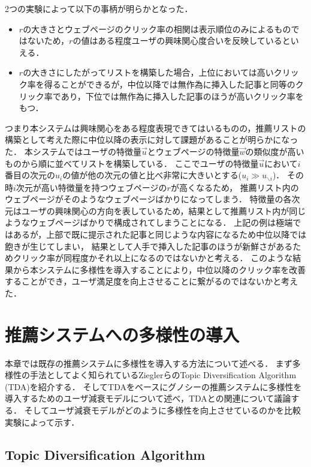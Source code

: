 \documentclass[japanese]{jnlp_1.4}
\begin{document}
2つの実験によって以下の事柄が明らかとなった．

\begin{itemize}
	\item $r$の大きさとウェブページのクリック率の相関は表示順位のみによるものではないため，$r$の値はある程度ユーザの興味関心度合いを反映しているといえる．
	\item $r$の大きさにしたがってリストを構築した場合，上位においては高いクリック率を得ることができるが，中位以降では無作為に挿入した記事と同等のクリック率であり，下位では無作為に挿入した記事のほうが高いクリック率をもつ．
\end{itemize}

つまり本システムは興味関心をある程度表現できてはいるものの，推薦リストの構築として考えた際に中位以降の表示に対して課題があることが明らかになった．
本システムではユーザの特徴量$\vec{u}$とウェブページの特徴量$\vec{w}$の類似度が高いものから順に並べてリストを構築している．
ここでユーザの特徴量$\vec{u}$において$i$番目の次元の$u_i$の値が他の次元の値と比べ非常に大きいとする($u_i \gg u_{\backslash i}$)．
その時$i$次元が高い特徴量を持つウェブページの$r$が高くなるため，
推薦リスト内のウェブページがそのようなウェブページばかりになってしまう．
特徴量の各次元はユーザの興味関心の方向を表しているため，結果として推薦リスト内が同じようなウェブページばかりで構成されてしまうことになる．
上記の例は極端ではあるが，上部で既に提示された記事と同じような内容になるため中位以降では飽きが生じてしまい，
結果として人手で挿入した記事のほうが新鮮さがあるためクリック率が同程度かそれ以上になるのではないかと考える．
このような結果から本システムに多様性を導入することにより，中位以降のクリック率を改善することができ，ユーザ満足度を向上させることに繋がるのではないかと考えた．


\section{推薦システムへの多様性の導入}
\label{sec:purpose}

本章では既存の推薦システムに多様性を導入する方法について述べる．
まず多様性の手法としてよく知られているZieglerらのTopic Diversification Algorithm (TDA)を紹介する\cite{ziegler2005}．
そしてTDAをベースにグノシーの推薦システムに多様性を導入するためのユーザ減衰モデルについて述べ，TDAとの関連について議論する．
そしてユーザ減衰モデルがどのように多様性を向上させているのかを比較実験によって示す．


\subsection{Topic Diversification Algorithm}
\end{document}
